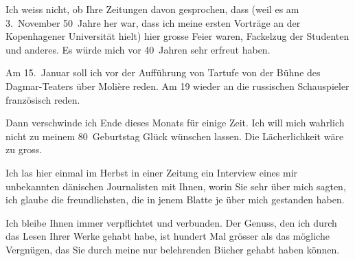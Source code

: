 \pstart
           Ich weiss nicht, ob Ihre Zeitungen davon gesprochen, dass (weil es am
                  3. November 50 Jahre her war, dass ich meine ersten Vorträge an der
                  Kopenhagener Universität hielt) hier grosse
               Feier waren, Fackelzug der Studenten {\pb}und anderes. Es würde mich vor
               40 Jahren sehr erfreut haben.\pend
           
\pstart
           Am 15. Januar soll ich vor der Aufführung von Tartufe von der Bühne des Dagmar-Teaters über Molière reden. Am
                  19 wieder an die russischen
               Schauspieler französisch reden.\pend
           
\pstart
           Dann verschwinde ich Ende dieses Monats für einige Zeit. Ich will mich wahrlich nicht
               zu meinem 80 Geburtstag Glück wünschen lassen. Die Lächerlichkeit wäre zu gross.\pend
           
\pstart
           Ich las hier einmal im Herbst in einer Zeitung ein Interview eines mir unbekannten { }dänischen Journalisten mit
               Ihnen, worin Sie sehr \label{K_L02373-2v}\label{K_L02373-2} über
               mich sagten, ich glaube die freundlichsten, die in jenem Blatte je über mich
               gestanden haben.\pend
           
\pstart
           Ich bleibe Ihnen immer verpflichtet und {\pb}verbunden. Der Genuss, den ich
               durch das Lesen Ihrer Werke gehabt habe, ist hundert Mal grösser als das mögliche
               Vergnügen, das Sie durch meine nur belehrenden Bücher gehabt haben können.\pend
           
